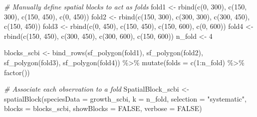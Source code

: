 \documentclass[12pt]{article}
\newenvironment{Shaded}{\begin{snugshade}}{\end{snugshade}}
\newcommand{\AttributeTok}[1]{\textcolor[rgb]{0.77,0.63,0.00}{#1}}
\newcommand{\CommentTok}[1]{\textcolor[rgb]{0.56,0.35,0.01}{\textit{#1}}}
\newcommand{\ConstantTok}[1]{\textcolor[rgb]{0.00,0.00,0.00}{#1}}
\newcommand{\DecValTok}[1]{\textcolor[rgb]{0.00,0.00,0.81}{#1}}
\newcommand{\FunctionTok}[1]{\textcolor[rgb]{0.00,0.00,0.00}{#1}}
\newcommand{\NormalTok}[1]{#1}
\newcommand{\OtherTok}[1]{\textcolor[rgb]{0.56,0.35,0.01}{#1}}
\newcommand{\SpecialCharTok}[1]{\textcolor[rgb]{0.00,0.00,0.00}{#1}}
\newcommand{\StringTok}[1]{\textcolor[rgb]{0.31,0.60,0.02}{#1}}
\begin{document}
\begin{Shaded}
\begin{Highlighting}[]
\CommentTok{\# Manually define spatial blocks to act as folds}
\NormalTok{fold1 }\OtherTok{\textless{}{-}} \FunctionTok{rbind}\NormalTok{(}\FunctionTok{c}\NormalTok{(}\DecValTok{0}\NormalTok{, }\DecValTok{300}\NormalTok{), }\FunctionTok{c}\NormalTok{(}\DecValTok{150}\NormalTok{, }\DecValTok{300}\NormalTok{), }\FunctionTok{c}\NormalTok{(}\DecValTok{150}\NormalTok{, }\DecValTok{450}\NormalTok{), }\FunctionTok{c}\NormalTok{(}\DecValTok{0}\NormalTok{, }\DecValTok{450}\NormalTok{))}
\NormalTok{fold2 }\OtherTok{\textless{}{-}} \FunctionTok{rbind}\NormalTok{(}\FunctionTok{c}\NormalTok{(}\DecValTok{150}\NormalTok{, }\DecValTok{300}\NormalTok{), }\FunctionTok{c}\NormalTok{(}\DecValTok{300}\NormalTok{, }\DecValTok{300}\NormalTok{), }\FunctionTok{c}\NormalTok{(}\DecValTok{300}\NormalTok{, }\DecValTok{450}\NormalTok{), }\FunctionTok{c}\NormalTok{(}\DecValTok{150}\NormalTok{, }\DecValTok{450}\NormalTok{))}
\NormalTok{fold3 }\OtherTok{\textless{}{-}} \FunctionTok{rbind}\NormalTok{(}\FunctionTok{c}\NormalTok{(}\DecValTok{0}\NormalTok{, }\DecValTok{450}\NormalTok{), }\FunctionTok{c}\NormalTok{(}\DecValTok{150}\NormalTok{, }\DecValTok{450}\NormalTok{), }\FunctionTok{c}\NormalTok{(}\DecValTok{150}\NormalTok{, }\DecValTok{600}\NormalTok{), }\FunctionTok{c}\NormalTok{(}\DecValTok{0}\NormalTok{, }\DecValTok{600}\NormalTok{))}
\NormalTok{fold4 }\OtherTok{\textless{}{-}} \FunctionTok{rbind}\NormalTok{(}\FunctionTok{c}\NormalTok{(}\DecValTok{150}\NormalTok{, }\DecValTok{450}\NormalTok{), }\FunctionTok{c}\NormalTok{(}\DecValTok{300}\NormalTok{, }\DecValTok{450}\NormalTok{), }\FunctionTok{c}\NormalTok{(}\DecValTok{300}\NormalTok{, }\DecValTok{600}\NormalTok{), }\FunctionTok{c}\NormalTok{(}\DecValTok{150}\NormalTok{, }\DecValTok{600}\NormalTok{))}
\NormalTok{n\_fold }\OtherTok{\textless{}{-}} \DecValTok{4}

\NormalTok{blocks\_scbi }\OtherTok{\textless{}{-}} \FunctionTok{bind\_rows}\NormalTok{(}\FunctionTok{sf\_polygon}\NormalTok{(fold1), }\FunctionTok{sf\_polygon}\NormalTok{(fold2), }\FunctionTok{sf\_polygon}\NormalTok{(fold3),}
    \FunctionTok{sf\_polygon}\NormalTok{(fold4)) }\SpecialCharTok{\%\textgreater{}\%}
    \FunctionTok{mutate}\NormalTok{(}\AttributeTok{folds =} \FunctionTok{c}\NormalTok{(}\DecValTok{1}\SpecialCharTok{:}\NormalTok{n\_fold) }\SpecialCharTok{\%\textgreater{}\%}
        \FunctionTok{factor}\NormalTok{())}

\CommentTok{\# Associate each observation to a fold}
\NormalTok{SpatialBlock\_scbi }\OtherTok{\textless{}{-}} \FunctionTok{spatialBlock}\NormalTok{(}\AttributeTok{speciesData =}\NormalTok{ growth\_scbi, }\AttributeTok{k =}\NormalTok{ n\_fold,}
    \AttributeTok{selection =} \StringTok{"systematic"}\NormalTok{, }\AttributeTok{blocks =}\NormalTok{ blocks\_scbi, }\AttributeTok{showBlocks =} \ConstantTok{FALSE}\NormalTok{, }\AttributeTok{verbose =} \ConstantTok{FALSE}\NormalTok{)}


\end{Highlighting}
\end{Shaded}
\end{document}
